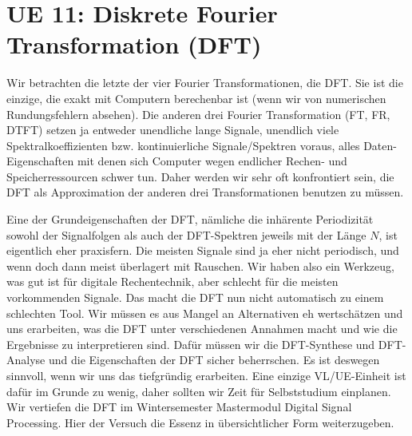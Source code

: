 \newpage
\section{UE 11: Diskrete Fourier Transformation (DFT)}
%
Wir betrachten die letzte der vier Fourier Transformationen, die DFT.
Sie ist die einzige, die exakt mit Computern berechenbar ist (wenn wir
von numerischen Rundungsfehlern absehen).
%
Die anderen drei Fourier Transformation (FT, FR, DTFT) setzen ja entweder
unendliche lange Signale, unendlich viele Spektralkoeffizienten bzw.
kontinuierliche Signale/Spektren
voraus, alles Daten-Eigenschaften mit denen sich Computer wegen endlicher
Rechen- und Speicherressourcen schwer tun.
%
Daher werden wir sehr oft konfrontiert sein, die DFT als Approximation
der anderen drei Transformationen benutzen zu müssen.
%

Eine der Grundeigenschaften der DFT, nämliche die inhärente
Periodizität sowohl der Signalfolgen als auch der DFT-Spektren jeweils mit
der Länge $N$, ist eigentlich
eher praxisfern. Die meisten Signale sind ja eher nicht periodisch, und wenn
doch dann meist überlagert mit Rauschen.
%
Wir haben also ein Werkzeug, was gut ist für digitale Rechentechnik, aber
schlecht für die meisten vorkommenden Signale.
%
Das macht die DFT nun nicht automatisch zu einem schlechten Tool. Wir müssen
es aus Mangel an Alternativen eh wertschätzen und uns erarbeiten, was die
DFT unter verschiedenen Annahmen macht und wie die Ergebnisse zu interpretieren
sind.
%
Dafür müssen wir die DFT-Synthese und DFT-Analyse
und die Eigenschaften der DFT sicher beherrschen.
%
%
Es ist deswegen sinnvoll, wenn wir uns das tiefgründig erarbeiten. Eine einzige
VL/UE-Einheit ist dafür im Grunde zu wenig, daher sollten wir Zeit für
Selbststudium einplanen. Wir vertiefen die DFT im Wintersemester
Mastermodul Digital Signal Processing.
Hier der Versuch die Essenz in übersichtlicher Form weiterzugeben.

